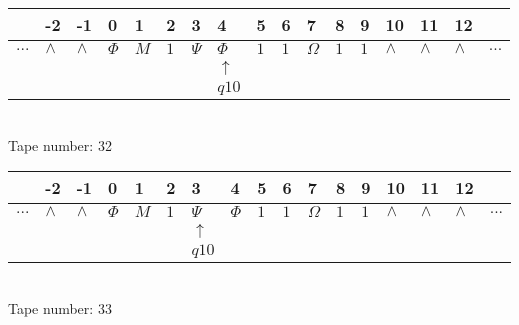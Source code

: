 \documentclass{article}
\begin{document}
\begin{table}[H]
\centering
\begin{tabular}{lllllllllllllllll}
 & -2 & -1 & 0 & 1 & 2 & 3 & 4 & 5 & 6 & 7 & 8 & 9 & 10 & 11 & 12 & \\
\hline
$...$ & \multicolumn{1}{|l|}{$\wedge$} & \multicolumn{1}{|l|}{$\wedge$} & \multicolumn{1}{|l|}{$\Phi$} & \multicolumn{1}{|l|}{$M$} & \multicolumn{1}{|l|}{$1$} & \multicolumn{1}{|l|}{$\Psi$} & \multicolumn{1}{|l|}{$\Phi$} & \multicolumn{1}{|l|}{$1$} & \multicolumn{1}{|l|}{$1$} & \multicolumn{1}{|l|}{$\Omega$} & \multicolumn{1}{|l|}{$1$} & \multicolumn{1}{|l|}{$1$} & \multicolumn{1}{|l|}{$\wedge$} & \multicolumn{1}{|l|}{$\wedge$} & \multicolumn{1}{|l|}{$\wedge$} & $...$\\
\hline
&  &  &  &  &  &  & $\uparrow$ &  &  &  &  &  &  &  &  &  \\
&  &  &  &  &  &  & $ q10 $ &  &  &  &  &  &  &  &  &  \\
\end{tabular}
\\
Tape number: 32
\noindent\makebox[\linewidth]{\hdashrule{\textwidth}{1pt}{1pt}}\end{table}

\begin{table}[H]
\centering
\begin{tabular}{lllllllllllllllll}
 & -2 & -1 & 0 & 1 & 2 & 3 & 4 & 5 & 6 & 7 & 8 & 9 & 10 & 11 & 12 & \\
\hline
$...$ & \multicolumn{1}{|l|}{$\wedge$} & \multicolumn{1}{|l|}{$\wedge$} & \multicolumn{1}{|l|}{$\Phi$} & \multicolumn{1}{|l|}{$M$} & \multicolumn{1}{|l|}{$1$} & \multicolumn{1}{|l|}{$\Psi$} & \multicolumn{1}{|l|}{$\Phi$} & \multicolumn{1}{|l|}{$1$} & \multicolumn{1}{|l|}{$1$} & \multicolumn{1}{|l|}{$\Omega$} & \multicolumn{1}{|l|}{$1$} & \multicolumn{1}{|l|}{$1$} & \multicolumn{1}{|l|}{$\wedge$} & \multicolumn{1}{|l|}{$\wedge$} & \multicolumn{1}{|l|}{$\wedge$} & $...$\\
\hline
&  &  &  &  &  & $\uparrow$ &  &  &  &  &  &  &  &  &  &  \\
&  &  &  &  &  & $ q10 $ &  &  &  &  &  &  &  &  &  &  \\
\end{tabular}
\\
Tape number: 33
\noindent\makebox[\linewidth]{\hdashrule{\textwidth}{1pt}{1pt}}\end{table}
\end{document}
